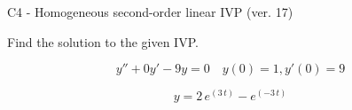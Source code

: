 \begin{exercise}
  \begin{exerciseTitle}C4 - Homogeneous second-order linear IVP (ver. 17)\end{exerciseTitle}
  \begin{exerciseStatement}
    
Find the solution to the given IVP.

    
\[y''+0y'-9y = 0 \hspace{1em} y(0) = 1 , y'(0) = 9\]

  \end{exerciseStatement}
  \begin{exerciseAnswer}
    
\[y= 2 \, e^{\left(3 \, t\right)} - e^{\left(-3 \, t\right)}\]

  \end{exerciseAnswer}
\end{exercise}